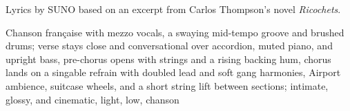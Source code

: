
\begin{notes}
Lyrics by SUNO based on an excerpt from Carlos Thompson's novel \emph{Ricochets}.
\end{notes}
\begin{style}
Chanson française with mezzo vocals, a swaying mid-tempo groove and brushed drums; verse stays close and conversational over accordion, muted piano, and upright bass, pre-chorus opens with strings and a rising backing hum, chorus lands on a singable refrain with doubled lead and soft gang harmonies, Airport ambience, suitcase wheels, and a short string lift between sections; intimate, glossy, and cinematic, light, low, chanson
\end{style}
